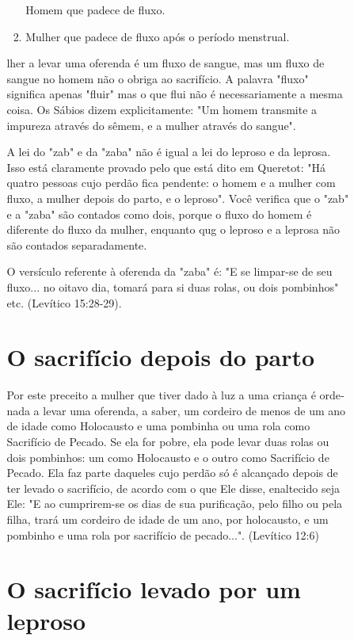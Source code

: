 \begin{itemize}
\begin{enumrate}
\begin{itemize}
\begin{itemize}
\begin{enumerate}
 Homem que padece de fluxo.
 
\item
 
 Mulher que padece de fluxo após o período menstrual.
 
\end{enumerate}




lher a levar uma oferenda é um fluxo de sangue, mas um fluxo de sangue
no homem não o obriga ao sacrifício. A palavra "fluxo" significa apenas
"fluir" mas o que flui não é necessariamente a mesma coisa. Os Sábios
dizem explicita­mente: "Um homem transmite a impureza através do sêmem,
e a mulher atra­vés do sangue".

A lei do "zab" e da "zaba" não é igual a lei do leproso e da leprosa.
Isso está claramente provado pelo que está dito em Queretot: "Há quatro
pes­soas cujo perdão fica pendente: o homem e a mulher com fluxo, a
mulher de­pois do parto, e o leproso". Você verifica que o "zab" e a
"zaba" são contados como dois, porque o fluxo do homem é diferente do
fluxo da mulher, enquan­to qug o leproso e a leprosa não são contados
separadamente.

O versículo referente à oferenda da "zaba" é: "E se limpar-se de seu
fluxo... no oitavo dia, tomará para si duas rolas, ou dois pombinhos"
etc. (Leví­tico 15:28-29).

\section{O sacrifício depois do parto}

Por este preceito a mulher que tiver dado à luz a uma criança é
orde­nada a levar uma oferenda, a saber, um cordeiro de menos de um ano
de idade como Holocausto e uma pombinha ou uma rola como Sacrifício de
Pecado. Se ela for pobre, ela pode levar duas rolas ou dois pombinhos:
um como Holo­causto e o outro como Sacrifício de Pecado. Ela faz parte
daqueles cujo perdão só é alcançado depois de ter levado o sacrifício,
de acordo com o que Ele disse, enaltecido seja Ele: "E ao cumprirem-se
os dias de sua purificação, pelo filho ou pela filha, trará um cordeiro
de idade de um ano, por holocausto, e um pom­binho e uma rola por
sacrifício de pecado...". (Levítico 12:6)

\section{O sacrifício levado por um leproso}


\end{itemize}
\end{itemize}
\end{enumrate}
\end{itemize}
